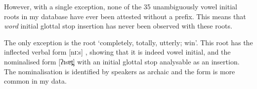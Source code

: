 \newpage
\begin{exe}
	\label{ex:GloIniRoo}
	\label{ex:VowIniRoo}
\end{exe}

However, with a single exception, none of the 35 unambiguously
vowel initial roots in my database have ever been attested without a prefix.
This means that \emph{word} initial glottal stop
insertion has never been observed with these roots.

The only exception is the root  `completely, totally, utterly; win'.
This root has the inflected verbal form  {\ra}  [nɪːs] {},
showing that it is indeed vowel initial, and the nominalised form
 [ʔɪsɐt̪] {} with an initial glottal stop analysable as an insertion.
The nominalisation  is identified by speakers
as archaic and the form  is more common in my data.

